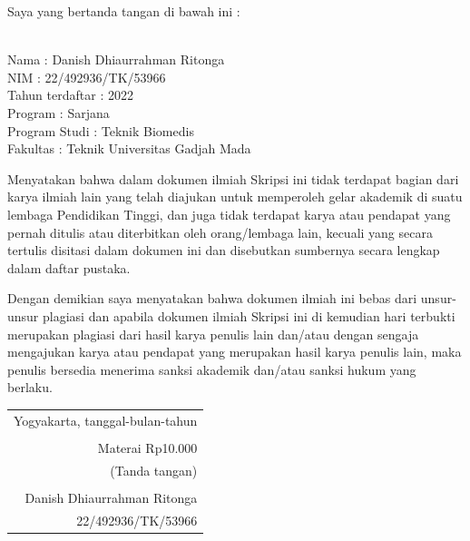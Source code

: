 \noindent Saya yang bertanda tangan di bawah ini :

\vspace{-1em}

\begin{tabbing}
\hspace{40mm} \= \\ %
\noindent Nama \> : Danish Dhiaurrahman Ritonga \\[\parskip]
\noindent NIM \> :  22/492936/TK/53966\\[\parskip]
\noindent Tahun terdaftar \> :  2022\\[\parskip]
\noindent Program \> : Sarjana \\[\parskip]
\noindent Program Studi \> :  Teknik Biomedis\\[\parskip]
\noindent Fakultas \> : Teknik Universitas Gadjah Mada
\end{tabbing}

\noindent Menyatakan bahwa dalam dokumen ilmiah Skripsi ini tidak terdapat bagian dari karya ilmiah lain yang telah diajukan untuk memperoleh gelar akademik di suatu lembaga Pendidikan Tinggi, dan juga tidak terdapat karya atau pendapat yang pernah ditulis atau diterbitkan oleh orang/lembaga lain, kecuali yang secara tertulis disitasi dalam dokumen ini dan disebutkan sumbernya secara lengkap dalam daftar pustaka.

\noindent Dengan demikian saya menyatakan bahwa dokumen ilmiah ini bebas dari unsur-unsur plagiasi dan apabila dokumen ilmiah Skripsi ini di kemudian hari terbukti merupakan plagiasi dari hasil karya penulis lain dan/atau dengan sengaja mengajukan karya atau pendapat yang merupakan hasil karya penulis lain, maka penulis bersedia menerima sanksi akademik dan/atau sanksi hukum yang berlaku.


\begin{flushright}
	\begin{tabular}{r}
		Yogyakarta, tanggal-bulan-tahun \\
		\vspace{0.1cm} \\
		\tiny{Materai Rp10.000} \\
		\tiny{(Tanda tangan)} \\	
		\vspace{0.1cm} \\
		Danish Dhiaurrahman Ritonga \\ 22/492936/TK/53966
	\end{tabular}
\end{flushright}
